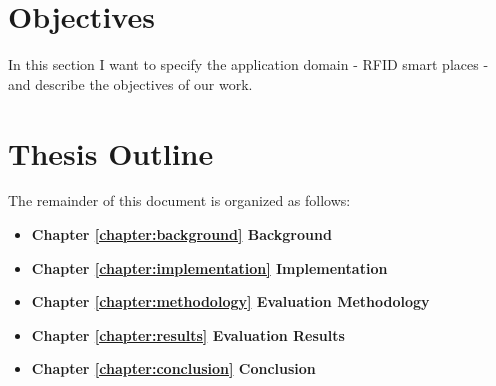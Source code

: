 \section{Objectives}
\label{section:objectives}
In this section I want to specify the application domain - RFID smart places - and describe the
objectives of our work.
\section{Thesis Outline}
\label{section:outline}
The remainder of this document is organized as follows:
\begin{itemize}
  \item \textbf{Chapter \ref{chapter:background} Background}
  \item \textbf{Chapter \ref{chapter:implementation} Implementation}
  \item \textbf{Chapter \ref{chapter:methodology} Evaluation Methodology}
  \item \textbf{Chapter \ref{chapter:results} Evaluation Results}
  \item \textbf{Chapter \ref{chapter:conclusion} Conclusion}
\end{itemize}
